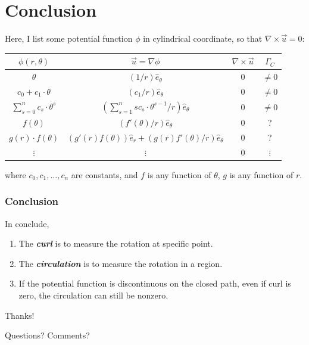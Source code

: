 \documentclass[11pt,]{beamer}
\begin{document}
\section{Conclusion}
\begin{frame}
	Here, I list some potential function $\phi$ in cylindrical coordinate, so that $\nabla\times\vec{u}=0$:
	\begin{table}[t]
	\begin{tabular}{c|c|c|c}
	$\phi(r,\theta)$	&	$\vec{u}=\nabla \phi$	& 	$\nabla \times \vec{u}$ & $\Gamma_{C}$ \\\hline\hline
	$\theta$	& 	$\displaystyle \left(1/r\right) \hat{e}_{\theta}$&$0$&$\neq 0$\\\hline
	$c_0+c_1\cdot\theta$	& 	$ \left(c_1/r\right) \hat{e}_{\theta}$&$0$&$\neq 0$\\\hline
	$\sum_{s=0}^{n}c_{s}\cdot\theta^{s}$	& $\left(\sum_{s=1}^{n}sc_{s}\cdot\theta^{s-1}/r\right) \hat{e}_{\theta}$&$0$&$\neq 0$\\\hline
	$f(\theta)$	& 	$\left(f'(\theta)/r\right) \hat{e}_{\theta}$	&	$0$ & ?\\\hline
	$g(r)\cdot f(\theta)$	& 	$\left(g'(r) f(\theta)\right) \hat{e}_{r} + \left(g(r) f'(\theta)/r\right) \hat{e}_{\theta}$	&	$0$  & ?\\\hline
	$\vdots$	& 	$\vdots$	&	$0$  & $\vdots$\\
	\end{tabular}
	\end{table}
	where $c_0,c_1,\ldots,c_n$ are constants, and $f$ is any function of $\theta$, $g$ is any function of $r$. 
\end{frame}
\begin{frame}
\frametitle{Conclusion}
In conclude, 
\begin{enumerate}
\item The \textbf{\textit{curl}} is to measure the rotation at specific point. 
\item The \textbf{\textit{circulation}} is to measure the rotation in a region.
\item If the potential function is discontinuous on the closed path, even if curl is zero, the circulation can still be nonzero.
\end{enumerate}
\end{frame}
\begin{frame}
	\begin{center}
		\bigskip\bigskip\bigskip
		{\Huge Thanks!}
		
		\bigskip\bigskip
		
		{\LARGE Questions? Comments?}
	\end{center}
\end{frame}


\end{document}

